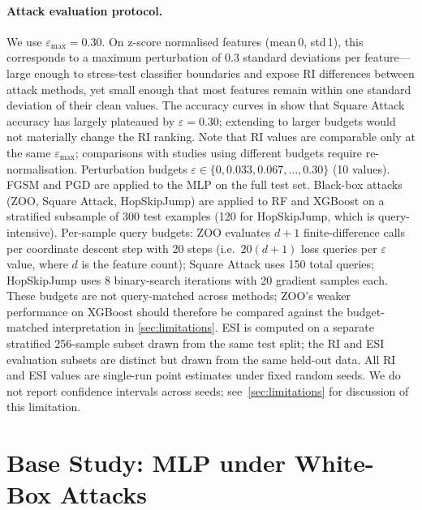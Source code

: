 \documentclass[runningheads]{llncs}
\begin{document}
\paragraph{Attack evaluation protocol.}
We use $\varepsilon_{\max} = 0.30$.  On z-score normalised features
(mean\,0, std\,1), this corresponds to a maximum perturbation of 0.3 standard
deviations per feature---large enough to stress-test classifier boundaries and
expose RI differences between attack methods, yet small enough that most features
remain within one standard deviation of their clean values.  The accuracy curves in  show that Square Attack
accuracy has largely plateaued by $\varepsilon = 0.30$; extending to larger
budgets would not materially change the RI ranking.  Note that RI values are comparable only at the same
$\varepsilon_{\max}$; comparisons with studies using different budgets require
re-normalisation.
Perturbation budgets $\varepsilon \in \{0, 0.033, 0.067, \ldots, 0.30\}$ (10
values).  FGSM and PGD are applied to the MLP on the full test set.  Black-box
attacks (ZOO, Square Attack, HopSkipJump) are applied to RF and XGBoost on a
stratified subsample of 300 test examples (120 for HopSkipJump, which is
query-intensive).  Per-sample query budgets: ZOO evaluates $d+1$ finite-difference
calls per coordinate descent step with 20 steps (i.e.\ $20(d+1)$ loss queries per
$\varepsilon$ value, where $d$ is the feature count); Square Attack uses 150
total queries; HopSkipJump uses 8 binary-search iterations with 20 gradient
samples each.  These budgets are not query-matched across methods; ZOO's weaker
performance on XGBoost should therefore be compared against the
budget-matched interpretation in \cref{sec:limitations}.  ESI is computed on a separate stratified 256-sample subset
drawn from the same test split; the RI and ESI evaluation subsets are distinct
but drawn from the same held-out data.
All RI and ESI values are single-run point estimates under fixed random seeds.
We do not report confidence intervals across seeds; see~\cref{sec:limitations}
for discussion of this limitation.

\section{Base Study: MLP under White-Box Attacks}
\label{sec:base}
\end{document}
